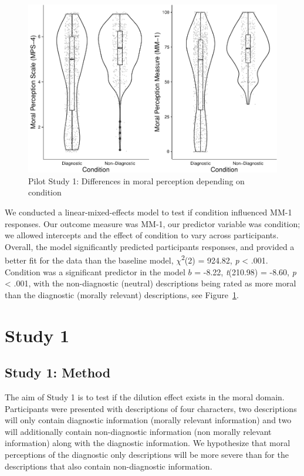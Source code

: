 \documentclass[
  english,
  man,floatsintext]{apa7}
\begin{document}
\begin{figure}
\centering
\includegraphics{moral_dilution_in_chunks_files/figure-latex/pilot1bothconditionplot-1.pdf}
\caption{\label{fig:pilot1bothconditionplot}Pilot Study 1: Differences in moral perception depending on condition}
\end{figure}

We conducted a linear-mixed-effects model to test if condition influenced MM-1 responses. Our outcome measure was MM-1, our predictor variable was condition; we allowed intercepts and the effect of condition to vary across participants. Overall, the model significantly predicted participants responses, and provided a better fit for the data than the baseline model, \(\chi\)\textsuperscript{2}(2) = 924.82, \emph{p} \textless{} .001. Condition was a significant predictor in the model \(b\) = -8.22, \emph{t}(210.98) = -8.60, \emph{p} \textless{} .001, with the non-diagnostic (neutral) descriptions being rated as more moral than the diagnostic (morally relevant) descriptions, see Figure~\ref{fig:pilot1bothconditionplot}.

\hypertarget{study-1}{%
\section{Study 1}\label{study-1}}

\hypertarget{study-1-method}{%
\subsection{Study 1: Method}\label{study-1-method}}

The aim of Study 1 is to test if the dilution effect exists in the moral domain. Participants were presented with descriptions of four characters, two descriptions will only contain diagnostic information (morally relevant information) and two will additionally contain non-diagnostic information (non morally relevant information) along with the diagnostic information. We hypothesize that moral perceptions of the diagnostic only descriptions will be more severe than for the descriptions that also contain non-diagnostic information.
\end{document}
